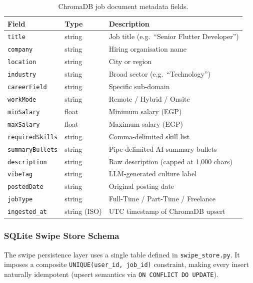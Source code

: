 \documentclass[12pt, a4paper, oneside]{report}
\begin{document}
\begin{table}[H]
  \centering
  \caption{ChromaDB job document metadata fields.}
  \label{tab:chroma-schema}
  \renewcommand{\arraystretch}{1.3}
  \begin{tabularx}{\textwidth}{@{} l l X @{}}
    \toprule
    \textbf{Field}       & \textbf{Type}   & \textbf{Description} \\
    \midrule
    \texttt{title}         & string          & Job title (e.g.\ ``Senior Flutter Developer'') \\
    \texttt{company}       & string          & Hiring organisation name \\
    \texttt{location}      & string          & City or region \\
    \texttt{industry}      & string          & Broad sector (e.g.\ ``Technology'') \\
    \texttt{careerField}   & string          & Specific sub-domain \\
    \texttt{workMode}      & string          & Remote / Hybrid / Onsite \\
    \texttt{minSalary}     & float           & Minimum salary (EGP) \\
    \texttt{maxSalary}     & float           & Maximum salary (EGP) \\
    \texttt{requiredSkills}& string          & Comma-delimited skill list \\
    \texttt{summaryBullets}& string          & Pipe-delimited AI summary bullets \\
    \texttt{description}   & string          & Raw description (capped at 1,000 chars) \\
    \texttt{vibeTag}       & string          & LLM-generated culture label \\
    \texttt{postedDate}    & string          & Original posting date \\
    \texttt{jobType}       & string          & Full-Time / Part-Time / Freelance \\
    \texttt{ingested\_at}  & string (ISO)    & UTC timestamp of ChromaDB upsert \\
    \bottomrule
  \end{tabularx}
\end{table}

\subsubsection*{SQLite Swipe Store Schema}

The swipe persistence layer uses a single table defined in \texttt{swipe\_store.py}. It
imposes a composite \texttt{UNIQUE(user\_id, job\_id)} constraint, making every insert
naturally idempotent (upsert semantics via \texttt{ON CONFLICT DO UPDATE}).
\end{document}
